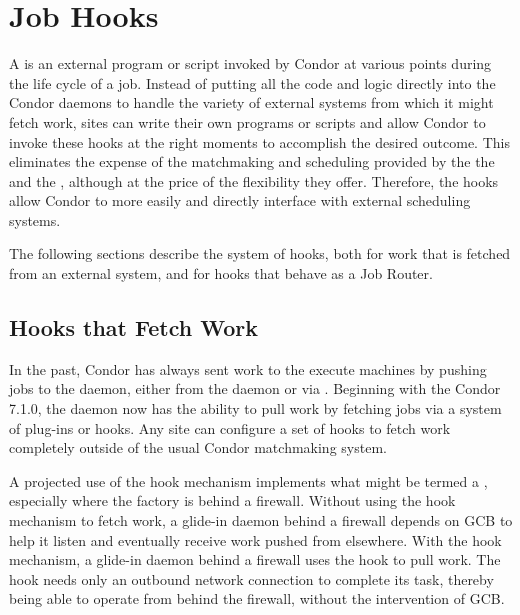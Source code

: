 \section{\label{sec:job-hooks}Job Hooks}

A  is an external program or script invoked by Condor at various
points during the life cycle of a job.
Instead of putting all the code and logic directly into the Condor
daemons to handle the variety of external systems from which it
might fetch work,
sites can write their own programs or scripts and allow
Condor to invoke these hooks at the right moments to accomplish the
desired outcome.
This eliminates the expense of the matchmaking and 
scheduling provided by the the  and
the , although at the price of the flexibility
they offer.
Therefore, the hooks allow Condor to more easily and directly interface with
external scheduling systems.


The following sections describe the system of hooks,
both for work that is fetched from an external system,
and for hooks that behave as a Job Router.


\subsection{\label{sec:job-hooks-overview}
Hooks that Fetch Work}

In the past, Condor has always sent work to the execute machines by
pushing jobs to the  daemon, either from the 
daemon or via .
Beginning with the Condor 7.1.0, the  daemon now has the
ability to pull work by fetching jobs via a system of plug-ins or
hooks.
Any site can configure a set of hooks to fetch work completely
outside of the usual Condor matchmaking system.

A projected use of the hook mechanism implements what might
be termed a , especially where the
factory is behind a firewall.
Without using the hook mechanism to fetch work,
a glide-in  daemon behind a firewall
depends on GCB to help it listen and eventually receive
work pushed from elsewhere.
With the hook mechanism, a glide-in  daemon
behind a firewall uses the hook to pull work.
The hook needs only an outbound network connection to complete
its task,
thereby being able to operate from behind the firewall,
without the intervention of GCB.


